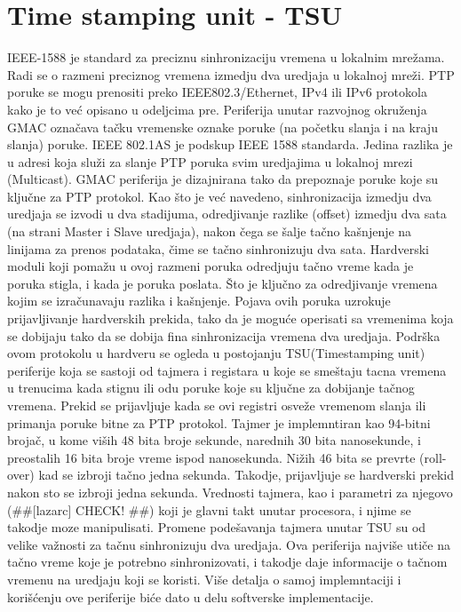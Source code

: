 \documentclass[a4paper,12pt, master]{etf}
\begin{document}
	\section{Time stamping unit - TSU}
	IEEE-1588 je standard za preciznu sinhronizaciju vremena u lokalnim mre\v{z}ama. Radi se o 
	razmeni	preciznog vremena izmedju dva uredjaja u lokalnoj mre\v{z}i. PTP poruke se mogu 
	prenositi preko	IEEE802.3/Ethernet, IPv4 ili IPv6 protokola kako je to ve\'{c} opisano u 
	odeljcima pre. Periferija unutar razvojnog okru\v{z}enja GMAC ozna\v{c}ava ta\v{c}ku 
	vremenske oznake poruke (na po\v{c}etku slanja i na kraju slanja) poruke. IEEE 802.1AS je 
	podskup IEEE 1588 standarda. Jedina razlika je u adresi koja slu\v{z}i za slanje PTP poruka 
	svim uredjajima u lokalnoj mrezi (Multicast). GMAC periferija je dizajnirana tako da 
	prepoznaje poruke koje su klju\v{c}ne za PTP protokol. Kao \v{s}to je ve\'{c} navedeno, 
	sinhronizacija izmedju dva uredjaja se izvodi u dva stadijuma, odredjivanje razlike	(offset) 
	izmedju dva sata (na strani Master i Slave uredjaja), nakon \v{c}ega se \v{s}alje ta\v{c}no	
	ka\v{s}njenje na linijama za prenos podataka, \v{c}ime se ta\v{c}no sinhronizuju dva sata. 
	Hardverski moduli koji poma\v{z}u u ovoj razmeni poruka odredjuju ta\v{c}no vreme kada je 
	poruka stigla, i kada je poruka poslata. \v{S}to je klju\v{c}no za odredjivanje vremena 
	kojim se izra\v{c}unavaju razlika i ka\v{s}njenje. Pojava ovih poruka uzrokuje 
	prijavljivanje hardverskih prekida, tako da je mogu\'{c}e operisati sa vremenima koja se 
	dobijaju tako da se dobija fina sinhronizacija vremena dva uredjaja. Podr\v{s}ka ovom 
	protokolu u hardveru se ogleda u postojanju TSU(Timestamping unit) periferije 
	koja se sastoji od tajmera i registara u koje se sme\v{s}taju tacna vremena u trenucima kada 
	stignu ili odu poruke koje su klju\v{c}ne za dobijanje ta\v{c}nog vremena. Prekid se 
	prijavljuje kada se ovi	registri osve\v{z}e vremenom slanja ili primanja poruke bitne za PTP 
	protokol. Tajmer je implemntiran kao 94-bitni broja\v{c}, u kome vi\v{s}ih 48 bita broje 
	sekunde, narednih 30 bita nanosekunde, i preostalih 16 bita broje vreme ispod nanosekunda. 
	Ni\v{z}ih 46 bita se prevrte (roll-over) kad se izbroji ta\v{c}no jedna sekunda. Takodje, 
	prijavljuje se hardverski prekid nakon sto se izbroji jedna sekunda. Vrednosti tajmera, kao 
	i parametri za njegovo (\#\#[lazarc] CHECK! \#\#) koji je glavni takt unutar procesora, i njime 
	se takodje moze manipulisati. Promene pode\v{s}avanja tajmera unutar TSU su od velike 
	va\v{z}nosti za ta\v{c}nu sinhronizuju dva uredjaja. Ova periferija najvi\v{s}e uti\v{c}e na 
	ta\v{c}no vreme koje je potrebno sinhronizovati, i takodje daje informacije o ta\v{c}nom 
	vremenu na uredjaju koji se koristi. Vi\v{s}e detalja o samoj implemntaciji i 
	kori\v{s}\'{c}enju ove periferije bi\'{c}e dato u delu softverske implementacije.
\end{document}
